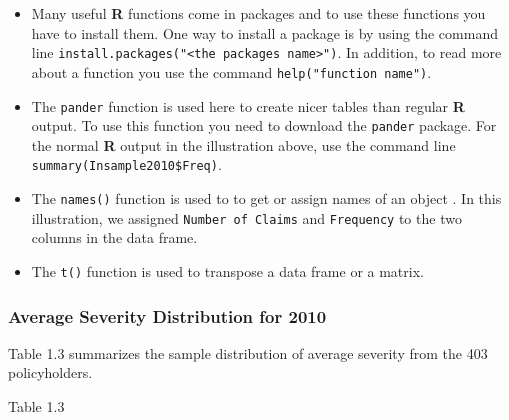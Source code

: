 \documentclass[]{book}
\newenvironment{Shaded}{\begin{snugshade}}{\end{snugshade}}
\newcommand{\KeywordTok}[1]{\textcolor[rgb]{0.13,0.29,0.53}{\textbf{#1}}}
\newcommand{\DecValTok}[1]{\textcolor[rgb]{0.00,0.00,0.81}{#1}}
\newcommand{\StringTok}[1]{\textcolor[rgb]{0.31,0.60,0.02}{#1}}
\newcommand{\OperatorTok}[1]{\textcolor[rgb]{0.81,0.36,0.00}{\textbf{#1}}}
\newcommand{\NormalTok}[1]{#1}
\theoremstyle{definition}
\theoremstyle{definition}
\theoremstyle{definition}
\theoremstyle{remark}
\begin{document}
\begin{itemize}
\item
  Many useful \textbf{R} functions come in packages and to use these
  functions you have to install them. One way to install a package is by
  using the command line
  \texttt{install.packages("\textless{}the\ package\textquotesingle{}s\ name\textgreater{}")}.
  In addition, to read more about a function you use the command
  \texttt{help("function\ name")}.
\item
  The \texttt{pander} function is used here to create nicer tables than
  regular \textbf{R} output. To use this function you need to download
  the \texttt{pander} package. For the normal \textbf{R} output in the
  illustration above, use the command line
  \texttt{summary(Insample2010\$Freq)}.
\item
  The \texttt{names()} function is used to to get or assign names of an
  object . In this illustration, we assigned \texttt{Number\ of\ Claims}
  and \texttt{Frequency} to the two columns in the data frame.
\item
  The \texttt{t()} function is used to transpose a data frame or a
  matrix.
\end{itemize}

\subsubsection{Average Severity Distribution for
2010}\label{average-severity-distribution-for-2010}

Table 1.3 summarizes the sample distribution of average severity from
the 403 policyholders.

Table 1.3

\begin{Shaded}
\end{Shaded}
\end{document}

